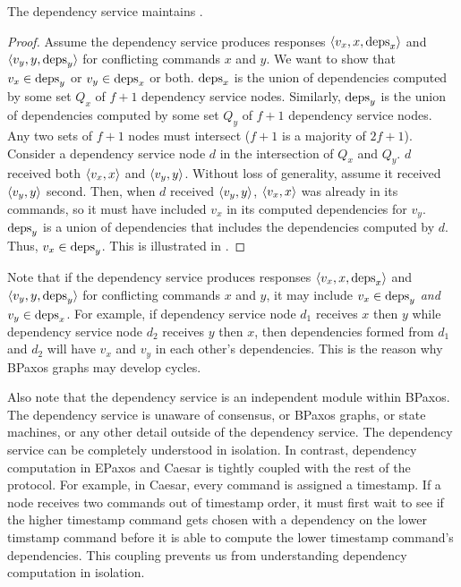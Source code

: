 \begin{theorem}
  The dependency service maintains .
\end{theorem}
\begin{proof}
  Assume the dependency service produces responses $\langle v_x, x, \text{deps}_x \rangle$ and
  $\langle v_y, y, \text{deps}_y \rangle$ for conflicting commands $x$ and $y$. We want to
  show that $v_x \in \text{deps}_y$ or $v_y \in \text{deps}_x$ or both. $\text{deps}_x$ is
  the union of dependencies computed by some set $Q_x$ of $f + 1$ dependency
  service nodes. Similarly, $\text{deps}_y$ is the union of dependencies computed
  by some set $Q_y$ of $f + 1$ dependency service nodes. Any two sets of $f +
  1$ nodes must intersect ($f+1$ is a majority of $2f+1$). Consider a
  dependency service node $d$ in the intersection of $Q_x$ and $Q_y$. $d$
  received both $\langle v_x, x \rangle$ and $\langle v_y, y \rangle$. Without loss of generality,
  assume it received $\langle v_y, y \rangle$ second. Then, when $d$ received $\langle v_y,
  y \rangle$, $\langle v_x, x \rangle$ was already in its \textsf{commands}, so it must have
  included $v_x$ in its computed dependencies for $v_y$. $\text{deps}_y$ is a union
  of dependencies that includes the dependencies computed by $d$. Thus, $v_x
  \in \text{deps}_y$. This is illustrated in .
\end{proof}

{}

Note that if the dependency service produces responses $\langle v_x, x,
\text{deps}_x \rangle$ and $\langle v_y, y, \text{deps}_y \rangle$ for conflicting commands $x$ and $y$,
it may include $v_x \in \text{deps}_y$ \emph{and} $v_y \in \text{deps}_x$. For example,
if dependency service node $d_1$ receives $x$ then $y$ while dependency service
node $d_2$ receives $y$ then $x$, then dependencies formed from $d_1$ and $d_2$
will have $v_x$ and $v_y$ in each other's dependencies. This is the reason why
BPaxos graphs may develop cycles.

Also note that the dependency service is an independent module within BPaxos.
The dependency service is unaware of consensus, or BPaxos graphs, or state
machines, or any other detail outside of the dependency service. The dependency
service can be completely understood in isolation. In contrast, dependency
computation in EPaxos and Caesar is tightly coupled with the rest of the
protocol. For example, in Caesar, every command is assigned a timestamp. If a
node receives two commands out of timestamp order, it must first wait to see if
the higher timestamp command gets chosen with a dependency on the lower
timstamp command before it is able to compute the lower timestamp command's
dependencies. This coupling prevents us from understanding dependency
computation in isolation.

